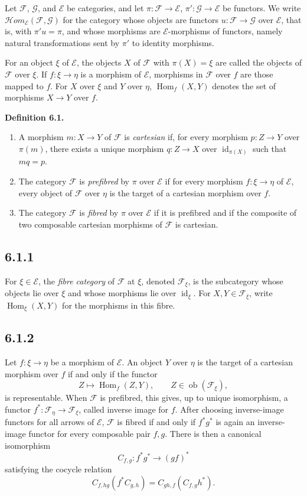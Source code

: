 \documentclass[11pt]{article}
\newcommand{\E}{\mathcal{E}}
\newcommand{\F}{\mathcal{F}}
\newcommand{\G}{\mathcal{G}}
\newcommand{\Hom}{\operatorname{Hom}}
\newcommand{\ob}{\operatorname{ob}}
\newcommand{\id}{\operatorname{id}}
\newenvironment{statement}[1]{\par\medskip\noindent\textbf{#1.}\ }{\par\medskip}
\begin{document}
Let \(\F\), \(\G\), and \(\E\) be categories, and let \(\pi:\F\to\E\), \(\pi':\G\to\E\) be functors. We write \(\mathcal{H}om_\E(\F,\G)\) for the category whose objects are functors \(u:\F\to\G\) over \(\E\), that is, with \(\pi'u=\pi\), and whose morphisms are \(\E\)-morphisms of functors, namely natural transformations sent by \(\pi'\) to identity morphisms.

For an object \(\xi\) of \(\E\), the objects \(X\) of \(\F\) with \(\pi(X)=\xi\) are called the objects of \(\F\) over \(\xi\). If \(f:\xi\to\eta\) is a morphism of \(\E\), morphisms in \(\F\) over \(f\) are those mapped to \(f\). For \(X\) over \(\xi\) and \(Y\) over \(\eta\), \(\Hom_f(X,Y)\) denotes the set of morphisms \(X\to Y\) over \(f\).

\begin{statement}{Definition 6.1}
\begin{enumerate}[label=\arabic*)]
\item A morphism \(m:X\to Y\) of \(\F\) is \emph{cartesian} if, for every morphism \(p:Z\to Y\) over \(\pi(m)\), there exists a unique morphism \(q:Z\to X\) over \(\id_{\pi(X)}\) such that \(mq=p\).
\item The category \(\F\) is \emph{prefibred} by \(\pi\) over \(\E\) if for every morphism \(f:\xi\to\eta\) of \(\E\), every object of \(\F\) over \(\eta\) is the target of a cartesian morphism over \(f\).
\item The category \(\F\) is \emph{fibred} by \(\pi\) over \(\E\) if it is prefibred and if the composite of two composable cartesian morphisms of \(\F\) is cartesian.
\end{enumerate}
\end{statement}

\subsection*{6.1.1}
For \(\xi\in\E\), the \emph{fibre category} of \(\F\) at \(\xi\), denoted \(\F_\xi\), is the subcategory whose objects lie over \(\xi\) and whose morphisms lie over \(\id_\xi\). For \(X,Y\in\F_\xi\), write \(\Hom_\xi(X,Y)\) for the morphisms in this fibre.

\subsection*{6.1.2}
Let \(f:\xi\to\eta\) be a morphism of \(\E\). An object \(Y\) over \(\eta\) is the target of a cartesian morphism over \(f\) if and only if the functor
\[
 Z\longmapsto \Hom_f(Z,Y),\qquad Z\in\ob(\F_\xi),
\]
is representable. When \(\F\) is prefibred, this gives, up to unique isomorphism, a functor \(f^*:\F_\eta\to\F_\xi\), called inverse image for \(f\). After choosing inverse-image functors for all arrows of \(\E\), \(\F\) is fibred if and only if \(f^*g^*\) is again an inverse-image functor for every composable pair \(f,g\). There is then a canonical isomorphism
\[
 C_{f,g}:f^*g^*\to(gf)^* \tag{6.1.2.1}
\]
satisfying the cocycle relation
\[
 C_{f,hg}(f^*C_{g,h})=C_{gh,f}(C_{f,g}h^*). \tag{6.1.2.2}
\]
\end{document}
